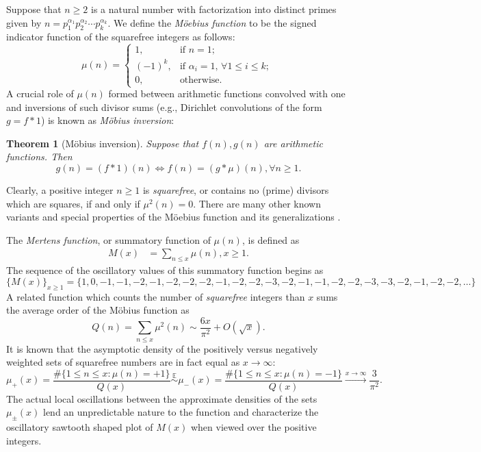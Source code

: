 \documentclass[11pt,reqno,a4letter]{article}
\numberwithin{figure}{section}
\numberwithin{table}{section}
\newcommand{\cf}{\textit{cf.\ }}
\newcommand{\seqnum}[1]{\href{http://oeis.org/#1}{\color{ProcessBlue}{\underline{#1}}}}
\theoremstyle{plain}
\newtheorem{theorem}{Theorem}
\numberwithin{theorem}{section}
\theoremstyle{definition}
\begin{document}
Suppose that $n \geq 2$ is a natural number with factorization into 
distinct primes given by 
$n = p_1^{\alpha_1} p_2^{\alpha_2} \cdots p_k^{\alpha_k}$. 
We define the \emph{M\"oebius function} to be the signed indicator function 
of the squarefree integers as follows: 
\[
\mu(n) = \begin{cases} 
     1, & \text{if $n = 1$; } \\ 
     (-1)^k, & \text{if $\alpha_i = 1$, $\forall 1 \leq i \leq k$; } \\ 
     0, & \text{otherwise.} 
     \end{cases} 
\]
A crucial role of $\mu(n)$ formed between arithmetic functions convolved with one 
and inversions of such divisor sums (e.g., Dirichlet convolutions of the form $g = f \ast 1$) is 
known as \emph{M\"obius inversion}: 

\begin{theorem}[M\"obius inversion] 
Suppose that $f(n), g(n)$ are arithmetic functions. Then 
\[
g(n) = (f \ast 1)(n) \iff f(n) = (g \ast \mu)(n), \forall n \geq 1. 
\]
\end{theorem} 

Clearly, a positive integer $n \geq 1$ is \emph{squarefree}, or contains no (prime) divisors which are 
squares, if and only if $\mu^2(n) = 0$. 
There are many other known variants and special properties of the M\"oebius function 
and its generalizations \cite[\cf \S 2]{HANDBOOKNT-2004}. 

The \emph{Mertens function}, or summatory function of $\mu(n)$, is defined as 
\begin{align*} 
M(x) & = \sum_{n \leq x} \mu(n), x \geq 1. 
\end{align*} 
The sequence of the oscillatory values of this summatory function begins as 
\cite[\seqnum{A002321}]{OEIS} 
\[
\{M(x)\}_{x \geq 1} = \{1, 0, -1, -1, -2, -1, -2, -2, -2, -1, -2, -2, -3, -2, 
     -1, -1, -2, -2, -3, -3, -2, -1, -2, -2, \ldots\}
\]
A related function which counts the 
number of \emph{squarefree} integers than $x$ sums the average order of the M\"obius function as 
\cite[\seqnum{A013928}]{OEIS} 
\[ 
Q(n) = \sum_{n \leq x} \mu^2(n) \sim \frac{6x}{\pi^2} + O\left(\sqrt{x}\right). 
\] 
It is known that the asymptotic density of the positively versus negatively 
weighted sets of squarefree numbers are in fact equal as $x \rightarrow \infty$: 
\[
\mu_{+}(x) = \frac{\#\{1 \leq n \leq x: \mu(n) = +1\}}{Q(x)} \overset{\mathbb{E}}{\sim} 
     \mu_{-}(x) = \frac{\#\{1 \leq n \leq x: \mu(n) = -1\}}{Q(x)} 
     \xrightarrow{x \rightarrow \infty} \frac{3}{\pi^2}. 
\]
The actual local oscillations between the approximate densities of the sets 
$\mu_{\pm}(x)$ lend an unpredictable nature to the function and characterize the 
oscillatory sawtooth shaped plot of $M(x)$ when viewed over the positive integers. 
\end{document}
